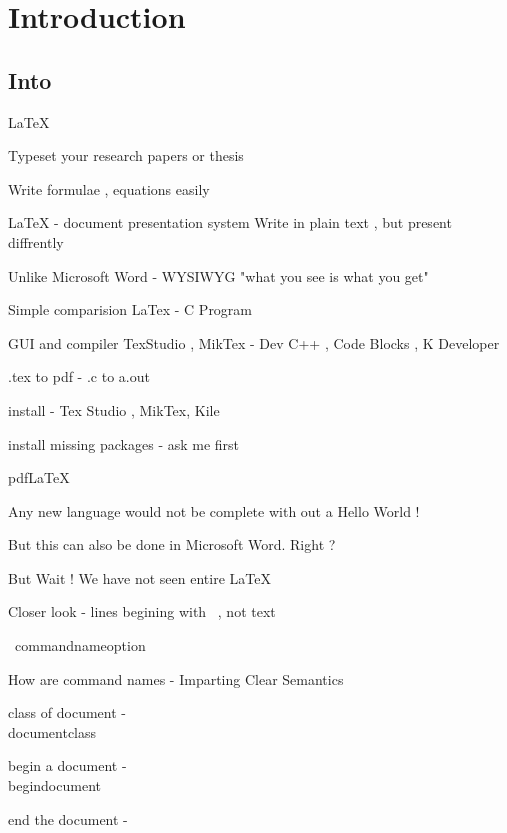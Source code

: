 \documentclass{report}
\begin{document}
\tableofcontents


\listoffigures


\chapter{Introduction}


\section{Into}

 LaTeX

 Typeset your research papers or thesis

 Write formulae , equations easily

 LaTeX - document presentation system
 Write in plain text , but present diffrently

 Unlike Microsoft Word - WYSIWYG "what you see is what you get"

 Simple comparision
			       LaTex - C Program
			       
 GUI and compiler TexStudio , MikTex - Dev C++ , Code Blocks , K Developer
 
			 .tex to pdf - .c to a.out
			 

 install - Tex Studio , MikTex, Kile

 install missing packages - ask me first

 pdfLaTeX


 Any new language would not be complete with out a Hello World !
 
 But this can also be done in Microsoft Word. Right ?

 But Wait ! We have not seen entire LaTeX

 Closer look - lines begining with \ , not text

 \ commandname{option}

 How are command names - Imparting Clear Semantics

 class of document - \\documentclass

 begin a document - \\begin{document}
                                   
 end the document - \
\end{document}

